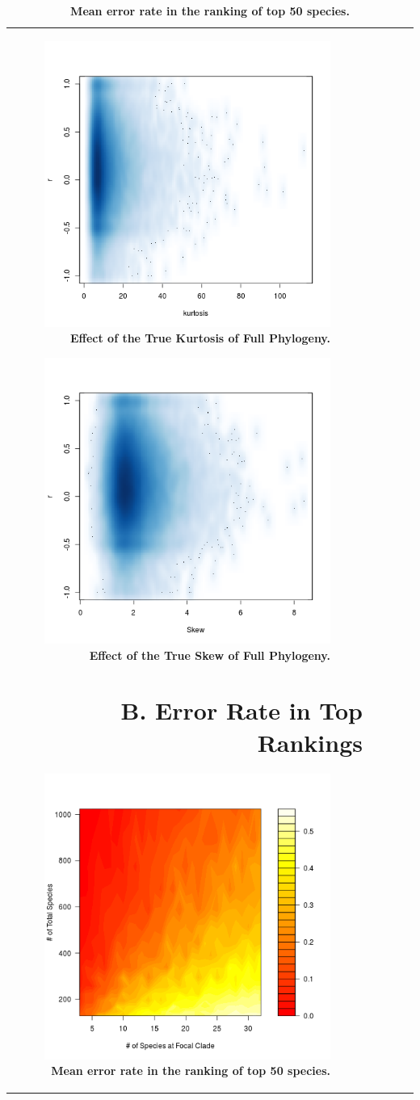 \documentclass[12pt,english]{article}
\begin{document}
\begin{table}[ht]
\begin{tabular}{rrrrr}
\begin{figure}[!ht]
  \center
  \includegraphics[width=.5\textwidth]{originalKurtosis.png}
  \caption{\textbf{Effect of the True Kurtosis of Full Phylogeny.}}
\end{figure}

\begin{figure}[!ht]
  \center
  \includegraphics[width=.5\textwidth]{originalSkew.png}
  \caption{\textbf{Effect of the True Skew of Full Phylogeny.}}
\end{figure}

\clearpage
\clearpage
\section*{B. Error Rate in Top Rankings}

\begin{figure}[!ht]
  \center
  \includegraphics[width=.5\textwidth]{errorRate50.png}
  \caption{\textbf{Mean error rate in the ranking of top 50 species.}}
\end{figure}


\end{tabular}
\end{table}
\end{document}
